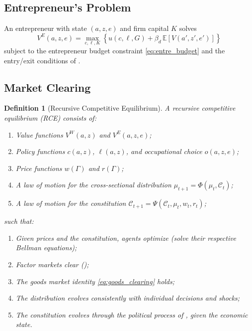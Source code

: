 \documentclass[12pt]{article}
\newtheorem{definition}{Definition}
\newcommand{\E}{\mathbb{E}}
\newcommand{\calC}{\mathcal{C}}
\begin{document}
\subsection{Entrepreneur's Problem}

An entrepreneur with state $(a, z, e)$ and firm capital $K$ solves
\begin{equation}\label{eq:bellman_entre}
  V^E(a, z, e) = \max_{c, \ell, K} \left\{ u(c, \ell, G) + \beta_d \, \E\!\left[V(a', z', e')\right] \right\}
\end{equation}
subject to the entrepreneur budget constraint \eqref{eq:entre_budget} and the entry/exit conditions of .

\subsection{Market Clearing}

\begin{definition}[Recursive Competitive Equilibrium]
A \emph{recursive competitive equilibrium} (RCE) consists of:
\begin{enumerate}
  \item Value functions $V^W(a, z)$ and $V^E(a, z, e)$;
  \item Policy functions $c(a, z)$, $\ell(a, z)$, and occupational choice $o(a, z, e)$;
  \item Price functions $w(\Gamma)$ and $r(\Gamma)$;
  \item A law of motion for the cross-sectional distribution $\mu_{t+1} = \Phi(\mu_t, \calC_t)$;
  \item A law of motion for the constitution $\calC_{t+1} = \Psi(\calC_t, \mu_t, w_t, r_t)$;
\end{enumerate}
such that:
\begin{enumerate}[label=(\alph*)]
  \item Given prices and the constitution, agents optimize (solve their respective Bellman equations);
  \item Factor markets clear ();
  \item The goods market identity \eqref{eq:goods_clearing} holds;
  \item The distribution evolves consistently with individual decisions and shocks;
  \item The constitution evolves through the political process of , given the economic state.
\end{enumerate}
\end{definition}
\end{document}
